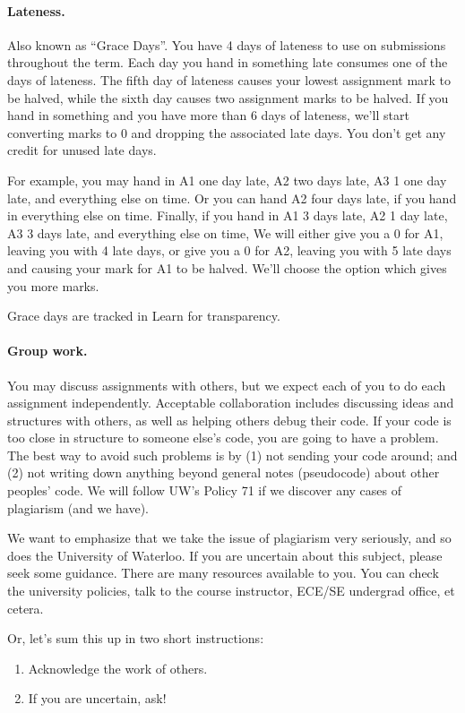 \documentclass[letterpaper,10pt]{article}
\begin{document}
\paragraph{Lateness.} Also known as ``Grace Days''. You have 4 days of lateness to use on 
submissions throughout the term. Each day you hand in something late
consumes one of the days of lateness. The fifth day of lateness causes
your lowest assignment mark to be halved, while the sixth day causes
two assignment marks to be halved. If you hand in something and you
have more than 6 days of lateness, we'll start converting marks to 0
and dropping the associated late days. You don't
get any credit for unused late days.

For example, you may hand in A1 one day late, A2 two days late, A3 1
one day late, and everything else on time.  Or you can hand A2 four
days late, if you hand in everything else on time. Finally, if you
hand in A1 3 days late, A2 1 day late, A3 3 days late, and
everything else on time, We will either give you a 0 for A1, leaving you
with 4 late days, or give you a 0 for A2, leaving you with 5 late days
and causing your mark for A1 to be halved. We'll choose the option
which gives you more marks.

Grace days are tracked in Learn for transparency.

\paragraph{Group work.} 
You may discuss assignments with others, but we expect each of you to
do each assignment independently. Acceptable collaboration includes
discussing ideas and structures with others, as well as helping others
debug their code. If your code is too close in structure to someone
else's code, you are going to have a problem. The best way to avoid
such problems is by (1) not sending your code around; and (2) not
writing down anything beyond general notes (pseudocode) about other
peoples' code. We will follow UW's Policy 71 if we discover any cases of
plagiarism (and we have). 

We want to emphasize that we take the issue of plagiarism very seriously, and so does the University of Waterloo. If you are uncertain about this subject, please seek some guidance. There are many resources available to you. You can check the university policies, talk to the course instructor, ECE/SE undergrad office, et cetera.

Or, let's sum this up in two short instructions:
\begin{enumerate}
	\item Acknowledge the work of others. 
	\item If you are uncertain, ask!
\end{enumerate}
\end{document}
